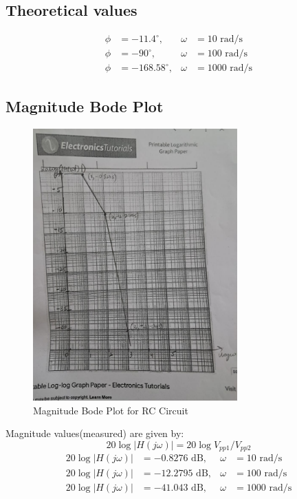 \documentclass[a4paper,12pt]{article}
\begin{document}
\subsection{Theoretical values}
\begin{align}
\phi &= -11.4^\circ , & \omega &= 10 \text{ rad/s} \\
\phi &= -90^\circ , & \omega &= 100 \text{ rad/s} \\
\phi &= -168.58^\circ , & \omega &= 1000 \text{ rad/s}
\end{align}
\subsection{Magnitude Bode Plot}
\begin{figure}[H]
    \centering
    \includegraphics[width=0.7\textwidth]{fig/mbd2.jpeg} %
    \caption{Magnitude Bode Plot for RC Circuit}
\end{figure}
Magnitude values(measured) are given by:
$$20\log{|H(j\omega)|}=20\log{V_{pp1}/V_{pp2}}$$
\begin{align}
20\log|H(j\omega)| &= -0.8276 \text{ dB}, & \omega &= 10 \text{ rad/s} \\
20\log|H(j\omega)| &= -12.2795 \text{ dB}, & \omega &= 100 \text{ rad/s} \\
20\log|H(j\omega)| &= -41.043 \text{ dB}, & \omega &= 1000 \text{ rad/s}
\end{align}
\end{document}
